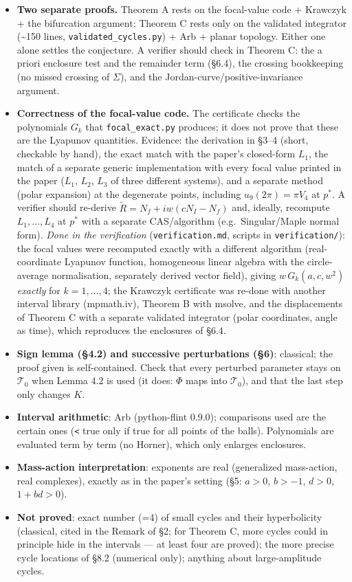 \documentclass[11pt,a4paper]{report}
\begin{document}
\begin{itemize}
\tightlist
\item
  \textbf{Two separate proofs.} Theorem A rests on the focal-value code + Krawczyk + the bifurcation argument;
  Theorem C rests only on the validated integrator (\textasciitilde150 lines, \texttt{validated\_cycles.py}) + Arb + planar
  topology. Either one alone settles the conjecture. A verifier should check in Theorem C: the a priori
  enclosure test and the remainder term (§6.4), the crossing bookkeeping (no missed crossing of
  \(\Sigma\)), and the Jordan-curve/positive-invariance argument.
\item
  \textbf{Correctness of the focal-value code.} The certificate checks the polynomials \(G_k\) that
  \texttt{focal\_exact.py} produces; it does not prove that these are the Lyapunov quantities. Evidence: the
  derivation in §3--4 (short, checkable by hand), the exact match with the paper's closed-form \(L_1\), the
  match of a separate generic implementation with every focal value printed in the paper (\(L_1\), \(L_2\),
  \(L_3\) of three different systems), and a separate method (polar expansion) at the degenerate points,
  including \(u_9(2\pi)=\pi V_4\) at \(p^*\). A verifier should re-derive \(\tilde R=N_f+iw(cN_I-N_f)\) and, ideally,
  recompute \(L_1,\dots,L_4\) at \(p^*\) with a separate CAS/algorithm (e.g.~Singular/Maple normal form).
  \emph{Done in the verification} (\texttt{verification.md}, scripts in \texttt{verification/}): the
  focal values were recomputed exactly with a different algorithm (real-coordinate Lyapunov function, homogeneous
  linear algebra with the circle-average normalisation, separately derived vector field), giving
  \(w\,G_k(a,c,w^2)\) \emph{exactly} for \(k=1,\dots,4\); the Krawczyk certificate was re-done with another interval
  library (mpmath.iv), Theorem B with msolve, and the displacements of Theorem C with a separate validated
  integrator (polar coordinates, angle as time), which reproduces the enclosures of §6.4.
\item
  \textbf{Sign lemma (§4.2) and successive perturbations (§6)}: classical; the proof given is self-contained.
  Check that every perturbed parameter stays on \(\mathcal T_0\) when Lemma 4.2 is used (it does: \(\Phi\) maps into
  \(\mathcal T_0\)), and that the last step only changes \(K\).
\item
  \textbf{Interval arithmetic}: Arb (python-flint 0.9.0); comparisons used are the certain ones (\texttt{\textless{}} true only if
  true for all points of the balls). Polynomials are evaluated term by term (no Horner), which only enlarges
  enclosures.
\item
  \textbf{Mass-action interpretation}: exponents are real (generalized mass-action, real complexes), exactly as in
  the paper's setting (§5: \(a>0\), \(b>-1\), \(d>0\), \(1+bd>0\)).
\item
  \textbf{Not proved}: exact number (=4) of small cycles and their hyperbolicity (classical, cited in the Remark of
  §2; for Theorem C, more cycles could in principle hide in the intervals --- at least four are proved); the
  more precise cycle locations of §8.2 (numerical only); anything about large-amplitude cycles.
\end{itemize}
\end{document}
